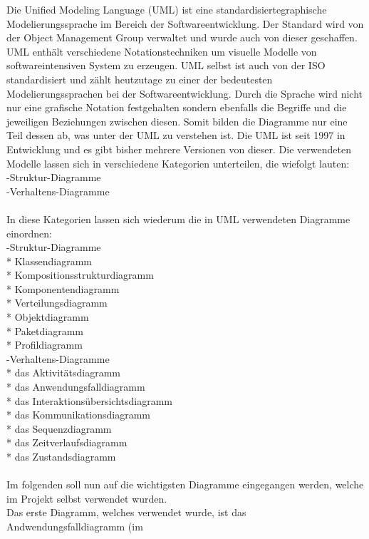 Die Unified Modeling Language (UML) ist eine standardisiertegraphische Modelierungssprache im Bereich der Softwareentwicklung. Der Standard wird von der Object Management Group verwaltet und wurde auch von dieser geschaffen. UML enthält verschiedene Notationstechniken um visuelle Modelle von softwareintensiven System zu erzeugen. UML selbst ist auch von der ISO standardisiert und zählt heutzutage zu einer der bedeutesten Modelierungssprachen bei der Softwareentwicklung. Durch die Sprache wird nicht nur eine grafische Notation festgehalten sondern ebenfalls die Begriffe und die jeweiligen Beziehungen zwischen diesen. Somit bilden die Diagramme nur eine Teil dessen ab, was unter der UML zu verstehen ist.
Die UML ist seit 1997 in Entwicklung und es gibt bisher mehrere Versionen von dieser.
Die verwendeten Modelle lassen sich in verschiedene Kategorien unterteilen, die wiefolgt lauten:\\
-Struktur-Diagramme\\
-Verhaltens-Diagramme\\
\\
In diese Kategorien lassen sich wiederum die in UML verwendeten Diagramme einordnen:\\
-Struktur-Diagramme\\
    * Klassendiagramm\\
    * Kompositionsstrukturdiagramm\\
    * Komponentendiagramm\\
    * Verteilungsdiagramm\\
    * Objektdiagramm\\
    * Paketdiagramm\\
    * Profildiagramm\\
-Verhaltens-Diagramme\\
    * das Aktivitätsdiagramm\\
    * das Anwendungsfalldiagramm\\
    * das Interaktionsübersichtsdiagramm\\
    * das Kommunikationsdiagramm\\
    * das Sequenzdiagramm\\
    * das Zeitverlaufsdiagramm\\
    * das Zustandsdiagramm\\
\\
Im folgenden soll nun auf die wichtigsten Diagramme eingegangen werden, welche im Projekt selbst verwendet wurden.\\
Das erste Diagramm, welches verwendet wurde, ist das Andwendungsfalldiagramm (im
